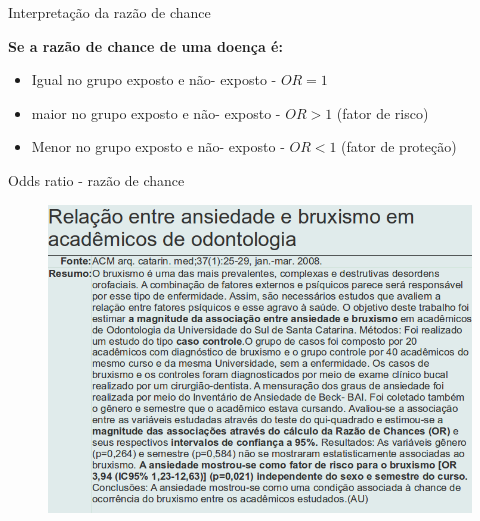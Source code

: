 \documentclass[9pt]{beamer}
\begin{document}
\begin{frame}{Interpretação da razão de chance}{}

\textbf{Se a razão de chance de uma doença é:}


\begin{itemize}
\item Igual no grupo exposto e não- exposto - $OR = 1$
\item maior no grupo exposto e não- exposto - $OR > 1$ (fator de risco)
\item Menor no grupo exposto e não- exposto - $OR < 1$ (fator de proteção)
\end{itemize}



\end{frame}


\begin{frame}{Odds ratio - razão de chance}{}

\begin{figure}[!htb]
    \centering
    \includegraphics[scale=0.385]{fig_odss.png}
  \end{figure}
\end{frame}
\end{document}
